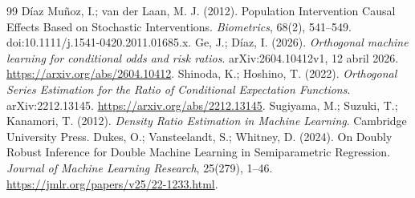 \documentclass[11pt,a4paper]{article}
\begin{document}
\begin{thebibliography}{99}
 Díaz Muñoz, I.; van der Laan, M. J. (2012). Population Intervention Causal Effects Based on Stochastic Interventions. \emph{Biometrics}, 68(2), 541--549. doi:10.1111/j.1541-0420.2011.01685.x.
 Ge, J.; Díaz, I. (2026). \emph{Orthogonal machine learning for conditional odds and risk ratios}. arXiv:2604.10412v1, 12 abril 2026. \url{https://arxiv.org/abs/2604.10412}.
 Shinoda, K.; Hoshino, T. (2022). \emph{Orthogonal Series Estimation for the Ratio of Conditional Expectation Functions}. arXiv:2212.13145. \url{https://arxiv.org/abs/2212.13145}.
 Sugiyama, M.; Suzuki, T.; Kanamori, T. (2012). \emph{Density Ratio Estimation in Machine Learning}. Cambridge University Press.
 Dukes, O.; Vansteelandt, S.; Whitney, D. (2024). On Doubly Robust Inference for Double Machine Learning in Semiparametric Regression. \emph{Journal of Machine Learning Research}, 25(279), 1--46. \url{https://jmlr.org/papers/v25/22-1233.html}.
\end{thebibliography}
\end{document}

